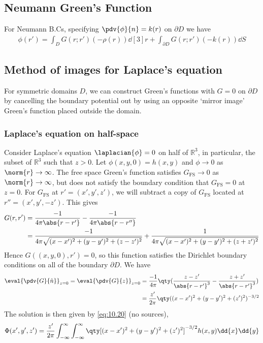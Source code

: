 \subsection{Neumann Green's Function}
For Neumann B.Cs, specifying $\pdv{\phi}{n} = k(r)$ on $\partial D$ we have
\begin{align} \label{eq:10.21}
	\phi(r') = \int_D G(r;r')(-\rho(r)) \dd[3]{r} + \int_{\partial D} G(r;r') (-k(r)) \dd{S}
\end{align}

\subsection{Method of images for Laplace's equation}
For symmetric domains $D$, we can construct Green's functions with $G = 0$ on $\partial D$ by cancelling the boundary potential out by using an opposite `mirror image' Green's function placed outside the domain.

\subsubsection{Laplace's equation on half-space}
Consider Laplace's equation $\laplacian{\phi} = 0$ on half of $\mathbb R^3$, in particular, the subset of $\mathbb R^3$ such that $z > 0$.
Let $\phi(x,y,0) = h(x,y)$ and $\phi \to 0$ as $\norm{r} \to \infty$.
The free space Green's function satisfies $G_{\mathrm{FS}} \to 0$ as $\norm{r} \to \infty$, but does not satisfy the boundary condition that $G_{\mathrm{FS}} = 0$ at $z = 0$.
For $G_{\mathrm{FS}}$ at $r' = (x',y',z')$, we will subtract a copy of $G_{\mathrm{FS}}$ located at $r'' = (x',y',-z')$.
This gives
\begin{align*}
	G(r,r') & = \frac{-1}{4\pi \abs{r - r'}} - \frac{-1}{4\pi \abs{r - r''}}                                                 \\
	        & = \frac{-1}{4\pi \sqrt{(x-x')^2 + (y-y')^2 + (z-z')^2}} + \frac{1}{4\pi \sqrt{(x-x')^2 + (y-y')^2 + (z+z')^2}}
\end{align*}
Hence $G((x,y,0), r') = 0$, so this function satisfies the Dirichlet boundary conditions on all of the boundary $\partial D$.
We have
\begin{align} \label{eq:10.22}
	\eval{\pdv{G}{\hat n}}_{z = 0} = \eval{\pdv{G}{z}}_{z = 0} &= \frac{-1}{4\pi} \qty(\frac{z - z'}{\abs{r - r'}^3} - \frac{z + z'}{\abs{r-r'}^3}) \\
	&= \frac{z'}{2\pi} \qty((x-x')^2 + (y-y')^2 + (z')^2)^{-3/2} \notag
\end{align}
The solution is then given by \cref{eq:10.20} (no sources),
\begin{align} \label{eq:10.23}
	\Phi(x',y',z') = \frac{z'}{2\pi} \int_{-\infty}^\infty \int_{-\infty}^\infty \qty[ (x - x')^2 + (y-y')^2 + (z')^2 ]^{-3/2} h(x,y) \dd{x}\dd{y}
\end{align}

